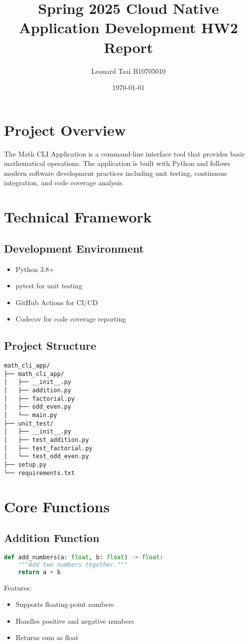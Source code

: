 \documentclass{article}
\begin{document}
\title{Spring 2025 Cloud Native Application Development HW2 \\ Report}
\author{Leonard Tsai B10705010}
\date{\today}

\maketitle
\section{Project Overview}
The Math CLI Application is a command-line interface tool that provides basic mathematical operations. The application is built with Python and follows modern software development practices including unit testing, continuous integration, and code coverage analysis.

\section{Technical Framework}
\subsection{Development Environment}
\begin{itemize}
    \item Python 3.8+
    \item pytest for unit testing
    \item GitHub Actions for CI/CD
    \item Codecov for code coverage reporting
\end{itemize}

\subsection{Project Structure}
\begin{verbatim}
math_cli_app/
├── math_cli_app/
│   ├── __init__.py
│   ├── addition.py
│   ├── factorial.py
│   ├── odd_even.py
│   └── main.py
├── unit_test/
│   ├── __init__.py
│   ├── test_addition.py
│   ├── test_factorial.py
│   └── test_odd_even.py
├── setup.py
└── requirements.txt
\end{verbatim}

\section{Core Functions}
\subsection{Addition Function}
\begin{lstlisting}[language=Python]
def add_numbers(a: float, b: float) -> float:
    """Add two numbers together."""
    return a + b
\end{lstlisting}
Features:
\begin{itemize}
    \item Supports floating-point numbers
    \item Handles positive and negative numbers
    \item Returns sum as float
\end{itemize}
\end{document}
